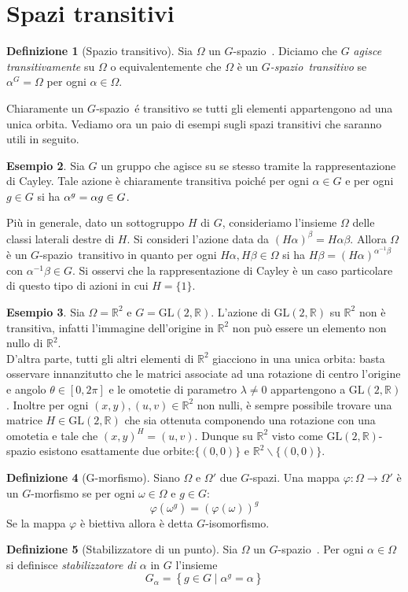 \documentclass[12pt,a4paper,openright]{report}
\newcommand{\R}{\mathbb{R}} %
\newcommand{\0}{\setminus\{0\}} %
\newcommand{\Gsp}{$G$-spazio~} %
\theoremstyle{definition}
\newtheorem{defn}{Definizione}[chapter]
\newtheorem{es}[defn]{Esempio}
\theoremstyle{plain}
\begin{document}
\section{Spazi transitivi}
\begin{defn}[Spazio transitivo]
Sia $\Omega$ un \Gsp. Diciamo che $G$ \textit{agisce transitivamente} su $\Omega$ o equivalentemente che $\Omega$ è un \emph{\Gsp transitivo} se $\alpha^G=\Omega$ per ogni $\alpha \in \Omega$.
\end{defn}
Chiaramente un \Gsp é transitivo se tutti gli elementi appartengono ad una unica orbita. Vediamo ora un paio di esempi sugli spazi transitivi che saranno utili in seguito.
\begin{es} \label{es:cayleygen}
Sia $G$ un gruppo che agisce su se stesso tramite la rappresentazione di Cayley. Tale azione è chiaramente transitiva poiché per ogni $\alpha \in G$ e per ogni $ g \in G$ si ha $ \alpha^g=\nobreak\alpha g \in\nobreak G$.

\smallskip Più in generale, dato un sottogruppo $H$ di $G$, consideriamo l'insieme $\Omega$ delle classi laterali destre di $H$. Si consideri l'azione data da $\left(H\alpha\right)^\beta=H\alpha\beta$. Allora $\Omega$ è un \Gsp transitivo in quanto per ogni $H\alpha, H\beta \in \Omega$ si ha $H\beta=(H\alpha)^{\alpha^{-1}\beta}$ con $\alpha^{-1}\beta \in G$. Si osservi che la rappresentazione di Cayley è un caso particolare di questo tipo di azioni in cui $H=\{1\}.$
\end{es}
\begin{es}\label{es:azionegl}
Sia $\Omega=\R^2$ e $G=\mathrm{GL}(2,\R)$. L'azione di $\mathrm{GL}(2,\R)$ su $\R^2$ non è transitiva, infatti l'immagine dell'origine in $\R^2$ non può essere un elemento non nullo di $\R^2$. \\
D'altra parte, tutti gli altri elementi di $\R^2$ giacciono in una unica orbita: basta osservare innanzitutto che le matrici associate ad una rotazione di centro l'origine e angolo $\theta \in [0,2\pi]$ e le omotetie di parametro $\lambda \neq 0$ appartengono a $\mathrm{GL}(2,\R)$. Inoltre per ogni $(x,y),(u,v) \in \R^2$ non nulli, è sempre possibile trovare una matrice $H \in \mathrm{GL}(2,\R)$ che sia ottenuta componendo una rotazione con una omotetia e tale che $(x,y)^H=(u,v)$.
Dunque su $\R^2$ visto come $\mathrm{GL}(2,\R)$-spazio esistono esattamente due orbite:$\{(0,0)\}$ e $\R^2 \backslash \{(0,0)\}$.
\end{es}
\begin{defn}[G-morfismo]
Siano $\Omega$ e $\Omega'$ due $G$-spazi. Una mappa $\varphi : \Omega \rightarrow \Omega'$ è un $G$-morfismo se per ogni $\omega \in \Omega$ e $g \in G$:
\[\varphi (\omega^g)=(\varphi (\omega))^g\]
Se la mappa $\varphi$ è biettiva allora è detta $G$-isomorfismo.
\end{defn}
\begin{defn}[Stabilizzatore di un punto]\label{defn:stab}
Sia $\Omega$ un \Gsp. Per ogni $\alpha \in \Omega$ si definisce \emph{stabilizzatore di $\alpha$} in $G$ l'insieme
\[G_{\alpha}= \left\lbrace g \in G \mid \alpha^g=\alpha \right\rbrace \] 
\end{defn}
\end{document}
